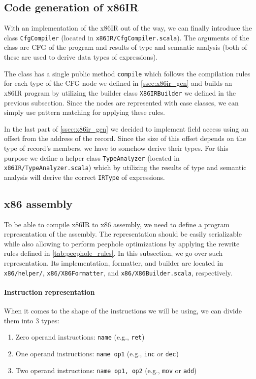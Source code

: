 \documentclass[thesis=M,english]{FITthesis}[2019/12/23]
\begin{document}
\subsection{Code generation of x86IR}
With an implementation of the x86IR out of the way, we can finally introduce the class \texttt{CfgCompiler} (located in \texttt{x86IR/CfgCompiler.scala}). The arguments of the class are CFG of the program and results of type and semantic analysis (both of these are used to derive data types of expressions).

The class has a single public method \texttt{compile} which follows the compilation rules for each type of the CFG node we defined in \autoref{ssec:x86ir_gen} and builds an x86IR program by utilizing the builder class \texttt{X86IRBuilder} we defined in the previous subsection. Since the nodes are represented with case classes, we can simply use pattern matching for applying these rules.

In the last part of \autoref{ssec:x86ir_gen} we decided to implement field access using an offset from the address of the record. Since the size of this offset depends on the type of record's members, we have to somehow derive their types. For this purpose we define a helper class \texttt{TypeAnalyzer} (located in \texttt{x86IR/TypeAnalyzer.scala}) which by utilizing the results of type and semantic analysis will derive the correct \texttt{IRType} of expressions.

\subsection{x86 assembly}
To be able to compile x86IR to x86 assembly, we need to define a program representation of the assembly. The representation should be easily serializable while also allowing to perform peephole optimizations by applying the rewrite rules defined in \autoref{tab:peephole_rules}. In this subsection, we go over such representation. Its implementation, formatter, and builder are located in \texttt{x86/helper/}, \texttt{x86/X86Formatter}, and \texttt{x86/X86Builder.scala}, respectively.

\paragraph*{Instruction representation} When it comes to the shape of the instructions we will be using, we can divide them into 3 types:
\begin{enumerate}
    \item Zero operand instructions: \texttt{name} (e.g., \texttt{ret})
    \item One operand instructions: \texttt{name op1} (e.g., \texttt{inc} or \texttt{dec})
    \item Two operand instructions: \texttt{name op1, op2} (e.g., \texttt{mov} or \texttt{add})
\end{enumerate}
\end{document}
